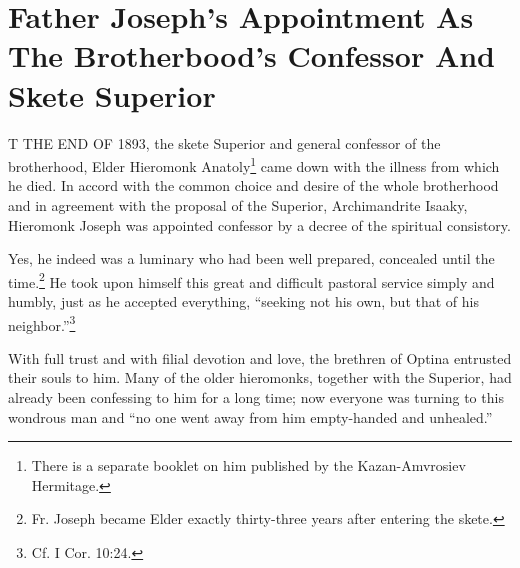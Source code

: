 \chapter{Father Joseph's Appointment As The Brotherbood's Confessor And Skete Superior}

T THE END OF 1893, the skete Superior and general confessor of the brotherhood, Elder Hieromonk Anatoly\footnote{There is a separate booklet on him published by the Kazan-Amvrosiev Hermitage.} came down with the illness from which he died. In accord with the common choice and desire of the whole brotherhood and in agreement with the proposal of the Superior, Archimandrite Isaaky, Hieromonk Joseph was appointed confessor by a decree of the spiritual consistory.

Yes, he indeed was a luminary who had been well prepared, concealed until the time.\footnote{Fr. Joseph became Elder exactly thirty-three years after entering the skete.} He took upon himself this great and difficult pastoral service simply and humbly, just as he accepted everything, ``seeking not his own, but that of his neighbor.''\footnote{Cf. I Cor. 10:24.}

With full trust and with filial devotion and love, the brethren of Optina entrusted their souls to him. Many of the older hieromonks, together with the Superior, had already been confessing to him for a long time; now everyone was turning to this wondrous man and ``no one went away from him empty-handed and unhealed.''

